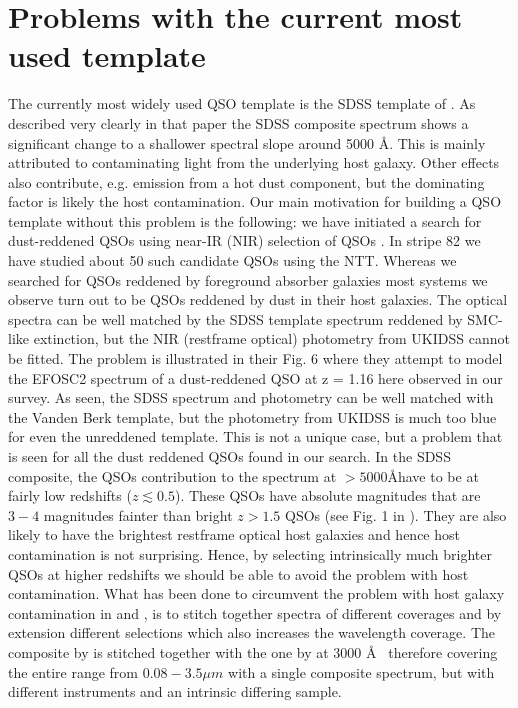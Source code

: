 \documentclass{aa}    %
\newcommand{\sectlabel}[1]{\label{sect:#1}}
\begin{document}
\section{Problems with the current most used template}   \sectlabel{problem}

The currently most widely used QSO template is the SDSS template of \citep{VandenBerk2001}. As described very clearly in that paper the SDSS composite spectrum shows a significant change to a shallower spectral slope around 5000 \AA. This is mainly attributed to contaminating light from the underlying host galaxy. Other effects also contribute, e.g. emission from a hot dust component, but the dominating factor is likely the host contamination. Our main motivation for building a QSO template without this problem is the following: we have initiated a search for dust-reddened QSOs using near-IR (NIR) selection of QSOs \citep{Fynbo2013}. In stripe 82 we have studied about 50 such candidate QSOs using the NTT. Whereas we searched for QSOs reddened by foreground absorber galaxies most systems we observe turn out to be QSOs reddened by dust in their host galaxies. The optical spectra can be well matched by the SDSS template spectrum reddened by SMC-like extinction, but the NIR (restframe optical) photometry from UKIDSS cannot be fitted. The problem is illustrated in their Fig. 6 where they attempt to model the EFOSC2 spectrum of a dust-reddened QSO at z = 1.16 here observed in our survey. As seen, the SDSS spectrum and photometry can be well matched with the Vanden Berk template, but the photometry from UKIDSS is much too blue for even the unreddened template. This is not a unique case, but a problem that is seen for all the dust reddened QSOs found in our search.
In the SDSS composite, the QSOs contribution to the spectrum at $ > 5000$\AA have to be at fairly low redshifts ($z \lesssim  0.5$). These QSOs have absolute magnitudes that are $3-4$ magnitudes fainter than bright $z > 1.5$ QSOs (see Fig. 1 in  \cite{VandenBerk2001}). They are also likely to have the brightest restframe optical host galaxies and hence host contamination is not surprising. Hence, by selecting intrinsically much brighter QSOs at higher redshifts we should be able to avoid the problem with host contamination.
What has been done to circumvent the problem with host galaxy contamination in \citet{Fynbo2013} and \citet{Krogager2015}, is to stitch together spectra of different coverages and by extension different selections which also increases the wavelength coverage. The composite by \citet{Glikman2006} is stitched together with the one by \citet{VandenBerk2001} at $3000$ \AA~ therefore covering the entire range from $0.08 - 3.5 \mu m$ with a single composite spectrum, but with different instruments and an intrinsic differing sample. 
\end{document}
